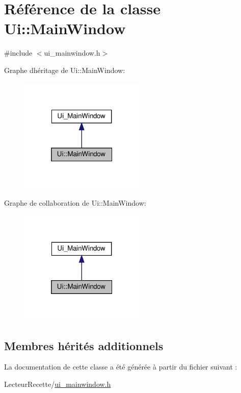 \hypertarget{class_ui_1_1_main_window}{}\section{Référence de la classe Ui\+:\+:Main\+Window}
\label{class_ui_1_1_main_window}


{\ttfamily \#include $<$ui\+\_\+mainwindow.\+h$>$}



Graphe d\textquotesingle{}héritage de Ui\+:\+:Main\+Window\+:
\nopagebreak
\begin{figure}[H]
\begin{center}
\leavevmode
\includegraphics[width=169pt]{class_ui_1_1_main_window__inherit__graph}
\end{center}
\end{figure}


Graphe de collaboration de Ui\+:\+:Main\+Window\+:
\nopagebreak
\begin{figure}[H]
\begin{center}
\leavevmode
\includegraphics[width=169pt]{class_ui_1_1_main_window__coll__graph}
\end{center}
\end{figure}
\subsection*{Membres hérités additionnels}


La documentation de cette classe a été générée à partir du fichier suivant \+:\begin{DoxyCompactItemize}
\item 
Lecteur\+Recette/\hyperlink{ui__mainwindow_8h}{ui\+\_\+mainwindow.\+h}\end{DoxyCompactItemize}
